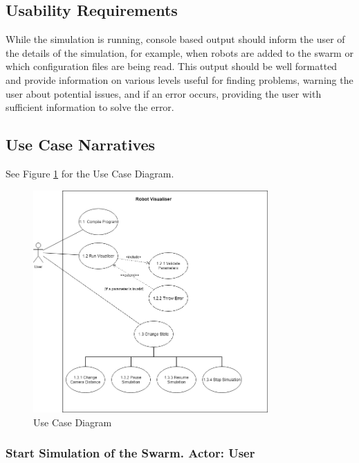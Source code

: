 \documentclass[11pt,a4paper]{article}
\begin{document}
\subsection{Usability Requirements}
While the simulation is running, console based output should inform the user of
the details of the simulation, for example, when robots are added to the swarm
or which configuration files are being read. This output should be well
formatted and provide information on various levels useful for finding
problems, warning the user about potential issues, and if an error occurs,
providing the user with sufficient information to solve the error.


\subsection{Use Case Narratives}
See Figure \ref{fig:use-case-diagram} for the Use Case Diagram.
\begin{figure}[htpb]
    \centering
    \includegraphics[width=0.8\textwidth]{2}
    \caption{Use Case Diagram}
    \label{fig:use-case-diagram}
\end{figure}
\subsubsection{Start Simulation of the Swarm. Actor: User}
\end{document}
